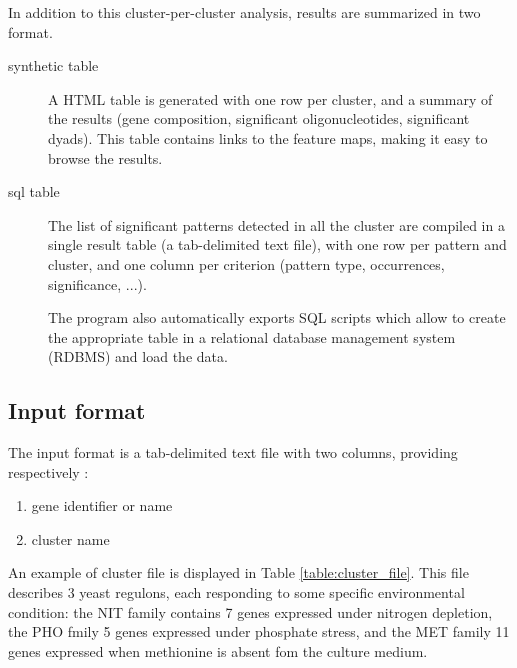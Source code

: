 In addition to this cluster-per-cluster analysis, results are
summarized in two format.

\begin{description}
\item[synthetic table] A HTML table is generated with one row per
cluster, and a summary of the results (gene composition, significant
oligonucleotides, significant dyads). This table contains links to the
feature maps, making it easy to browse the results.

\item[sql table] The list of significant patterns detected in all the
cluster are compiled in a single result table (a tab-delimited text
file), with one row per pattern and cluster, and one column per
criterion (pattern type, occurrences, significance, ...). 

The program also automatically exports SQL scripts which allow to
create the appropriate table in a relational database management
system (RDBMS) and load the data.
\end{description}

\subsection{Input format}

The input format is a tab-delimited text file with two columns, providing respectively :
\begin{enumerate}
\item gene identifier or name
\item cluster name
\end{enumerate}

An example of cluster file is displayed in Table
\ref{table:cluster_file}. This file describes 3 yeast regulons, each
responding to some specific environmental condition: the NIT family
contains 7 genes expressed under nitrogen depletion, the PHO fmily 5
genes expressed under phosphate stress, and the MET family 11 genes
expressed when methionine is absent fom the culture medium.


